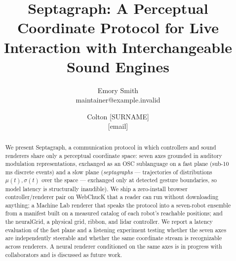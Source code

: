 \documentclass[10pt,twocolumn]{article}
\title{\textbf{Septagraph: A Perceptual Coordinate Protocol for Live
Interaction with Interchangeable Sound Engines}}
\author{Emory Smith \\ \small maintainer@example.invalid
  \and Colton [SURNAME] \\ \small [email]}
\date{}
\begin{document}
\maketitle


\begin{abstract}
We present Septagraph, a communication protocol in which controllers and
sound renderers share only a perceptual coordinate space: seven axes
grounded in auditory modulation representations, exchanged as an OSC
sublanguage on a fast plane (sub-10\,ms discrete events) and a slow plane
(\emph{septagraphs} --- trajectories of distributions $\mu(t), \sigma(t)$
over the space --- exchanged only at detected gesture boundaries, so
model latency is structurally inaudible). We ship a zero-install
browser controller/renderer pair on WebChucK that a reader can run
without downloading anything; a Machine Lab renderer that speaks the
protocol into a seven-robot ensemble from a manifest built on a measured
catalog of each robot's reachable positions; and the neuralGrid, a
physical grid, ribbon, and lidar controller. We report a latency
evaluation of the fast plane and a listening experiment testing whether
the seven axes are independently steerable and whether the same
coordinate stream is recognizable across renderers. A neural renderer
conditioned on the same axes is in progress with collaborators and is
discussed as future work.
\end{abstract}
\end{document}
